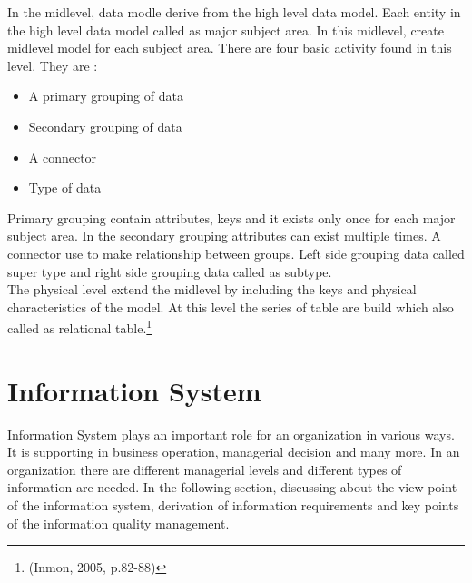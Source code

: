 In the midlevel, data modle derive from the high level data model. Each entity in the high level data model called as major subject area. In this midlevel, create midlevel model for each subject area. There are four basic activity found in this level. They are :
\begin{itemize}
\item A primary grouping of data
\item Secondary grouping of data
\item A connector
\item Type of data

\end{itemize}

Primary grouping contain attributes, keys and it exists only once for each major subject area. In the secondary grouping attributes can exist multiple times. A connector use to make relationship between groups. Left side grouping data called super type and right side grouping data called as subtype.\\

The physical level extend the midlevel by including the keys and physical characteristics  of the model. At this level the series of table are build which also called as relational table.\footnote{(Inmon, 2005, p.82-88)} \newpage

\section{ Information System}
Information System plays an important role for an organization in various ways. It is supporting in business operation, managerial decision and many more. In an organization there are different managerial levels and different types of information are needed.  In the following section, discussing about the view point of the information system, derivation of information requirements and key points of the information quality management. 
